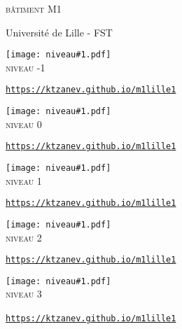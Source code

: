 \documentclass{article}
\newcommand{\niveau}[1]{
\clearpage
\begin{center}
  \texttt{[image: niveau\#1.pdf]}\\
  {\Huge \textsc{niveau #1}}
\end{center}
\vfill\hfill\tiny\texttt{\url{https://ktzanev.github.io/m1lille1}}
}
\begin{document}
\begin{center}
\vspace*{\fill}
{\Huge \textsc{bâtiment M1}}

\vspace{1cm}
{\Large Université de Lille - FST}
\vspace*{\fill}
\end{center}

\niveau{-1}
\niveau{0}
\niveau{1}
\niveau{2}
\niveau{3}~
\end{document}
